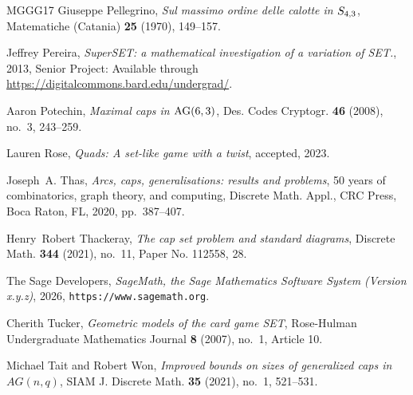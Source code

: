 \documentclass[12pt]{amsart}
\theoremstyle{definition}
\begin{document}
\begin{thebibliography}{MGGG17}
Giuseppe Pellegrino, \emph{Sul massimo ordine delle calotte in {$S\sb{4,3}$}},
  Matematiche (Catania) \textbf{25} (1970), 149--157.

Jeffrey Pereira, \emph{Super{SET}: a mathematical investigation of a variation
  of {SET}.}, 2013, Senior Project: Available through
  \url{https://digitalcommons.bard.edu/undergrad/}.

Aaron Potechin, \emph{Maximal caps in {${\rm AG}(6,3)$}}, Des. Codes Cryptogr.
  \textbf{46} (2008), no.~3, 243--259.

Lauren Rose, \emph{Quads: A set-like game with a twist}, accepted, 2023.

Joseph~A. Thas, \emph{Arcs, caps, generalisations: results and problems}, 50
  years of combinatorics, graph theory, and computing, Discrete Math. Appl.,
  CRC Press, Boca Raton, FL, 2020, pp.~387--407.

Henry~Robert Thackeray, \emph{The cap set problem and standard diagrams},
  Discrete Math. \textbf{344} (2021), no.~11, Paper No. 112558, 28.

{The Sage Developers}, \emph{{S}age{M}ath, the {S}age {M}athematics {S}oftware
  {S}ystem ({V}ersion x.y.z)}, 2026, {\tt https://www.sagemath.org}.

Cherith Tucker, \emph{Geometric models of the card game {SET}}, {R}ose-{H}ulman
  Undergraduate Mathematics Journal \textbf{8} (2007), no.~1, Article 10.

Michael Tait and Robert Won, \emph{Improved bounds on sizes of generalized caps
  in {$AG(n,q)$}}, SIAM J. Discrete Math. \textbf{35} (2021), no.~1, 521--531.

\end{thebibliography}
\end{document}
